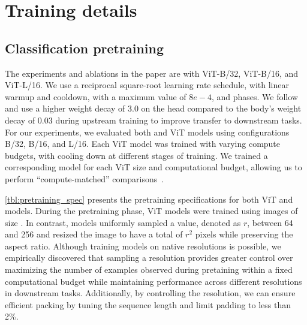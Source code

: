 \section{Training details}

\subsection{Classification pretraining}
\label{app:classification_deets}
The experiments and ablations in the paper are with ViT-B/32, ViT-B/16, and ViT-L/16. We use a reciprocal square-root learning rate schedule, with linear warmup and cooldown, with a maximum value of $8e-4$, and  phases. We follow ~\citep{zhai2022scaling, abnar2021exploring} and use a higher weight decay of $3.0$ on the head compared to the body's weight decay of $0.03$ during upstream training to improve transfer to downstream tasks. 
For our experiments, we evaluated both \navit and ViT models using configurations B/32, B/16, and L/16. Each ViT model was trained with varying compute budgets, with cooling down at different stages of training. We trained a corresponding \navit model for each ViT size and computational budget, allowing us to perform ``compute-matched'' comparisons~\citep{dehghani2021efficiency}.

\cref{tbl:pretraining_spec} presents the pretraining specifications for both ViT and \navit models. During the pretraining phase, ViT models were trained using images of size . In contrast, \navit models uniformly sampled a value, denoted as $r$, between 64 and 256 and resized the image to have a total of $r^2$ pixels while preserving the aspect ratio. Although training \navit models on native resolutions is possible, we empirically discovered that sampling a resolution provides greater control over maximizing the number of examples observed during pretaining within a fixed computational budget while maintaining performance across different resolutions in downstream tasks. Additionally, by controlling the resolution, we can ensure efficient packing by tuning the sequence length and limit padding to less than 2\%.

